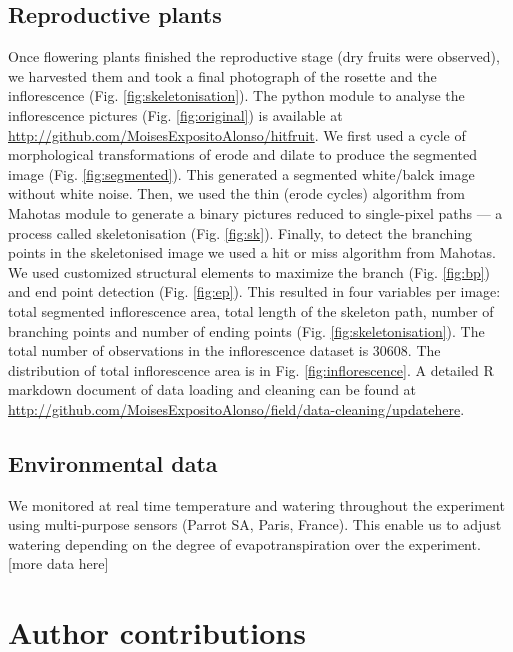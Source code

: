 \documentclass[12pt,]{article}
\begin{document}
\subsection{Reproductive plants}\label{reproductive-plants}

Once flowering plants finished the reproductive stage (dry fruits were
observed), we harvested them and took a final photograph of the rosette
and the inflorescence (Fig. \ref{fig:skeletonisation}). The python
module to analyse the inflorescence pictures (Fig. \ref{fig:original})
is available at \url{http://github.com/MoisesExpositoAlonso/hitfruit}.
We first used a cycle of morphological transformations of erode and
dilate to produce the segmented image (Fig. \ref{fig:segmented}). This
generated a segmented white/balck image without white noise. Then, we
used the thin (erode cycles) algorithm from Mahotas module to generate a
binary pictures reduced to single-pixel paths --- a process called
skeletonisation (Fig. \ref{fig:sk}). Finally, to detect the branching
points in the skeletonised image we used a hit or miss algorithm from
Mahotas. We used customized structural elements to maximize the branch
(Fig. \ref{fig:bp}) and end point detection (Fig. \ref{fig:ep}). This
resulted in four variables per image: total segmented inflorescence
area, total length of the skeleton path, number of branching points and
number of ending points (Fig. \ref{fig:skeletonisation}). The total
number of observations in the inflorescence dataset is 30608. The
distribution of total inflorescence area is in Fig.
\ref{fig:inflorescence}. A detailed R markdown document of data loading
and cleaning can be found at
\url{http://github.com/MoisesExpositoAlonso/field/data-cleaning/updatehere}.

\subsection{Environmental data}\label{environmental-data}

We monitored at real time temperature and watering throughout the
experiment using multi-purpose sensors (Parrot SA, Paris, France). This
enable us to adjust watering depending on the degree of
evapotranspiration over the experiment. {[}more data here{]}

\section{Author contributions}\label{author-contributions}
\end{document}
